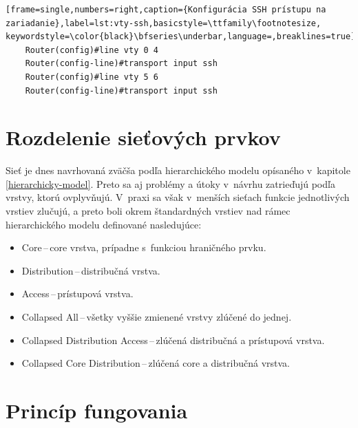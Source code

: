 \begin{enumerate}
\begin{minipage}{\linewidth}		
	\begin{lstlisting}[frame=single,numbers=right,caption={Konfigurácia SSH prístupu na zariadanie},label=lst:vty-ssh,basicstyle=\ttfamily\footnotesize, keywordstyle=\color{black}\bfseries\underbar,language=,breaklines=true]
	Router(config)#line vty 0 4
	Router(config-line)#transport input ssh
	Router(config)#line vty 5 6
	Router(config-line)#transport input ssh
	\end{lstlisting}
\end{minipage}	
	
		
\end{enumerate}
\newpage
\section{Rozdelenie sieťových prvkov}
\label{hierarchydesign}
Sieť je dnes navrhovaná zväčša podľa hierarchického modelu opísaného v~kapitole \ref{hierarchicky-model}. Preto sa aj problémy a útoky v~návrhu zatrieďujú podľa vrstvy, ktorú ovplyvňujú. V~praxi sa však v~menších sieťach funkcie jednotlivých vrstiev zlučujú, a preto boli okrem štandardných vrstiev nad rámec hierarchického modelu definované nasledujúce:

\begin{itemize}
	\item Core\,--\,core vrstva, prípadne s~funkciou hraničného prvku.
	\item Distribution\,--\,distribučná vrstva.
	\item Access\,--\,prístupová vrstva.
	\item Collapsed All\,--\,všetky vyššie zmienené vrstvy zlúčené do jednej.
	\item Collapsed Distribution Access\,--\,zlúčená distribučná a prístupová vrstva.
	\item Collapsed Core Distribution\,--\,zlúčená core a distribučná vrstva.
\end{itemize}

\section{Princíp fungovania}

